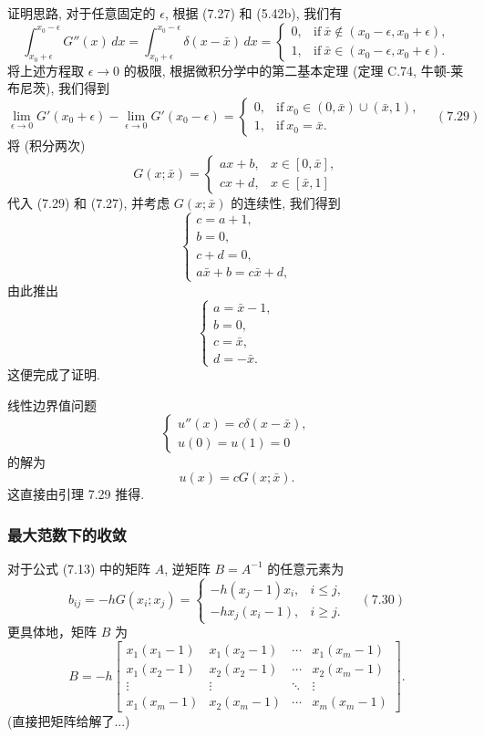 \documentclass[a4paper]{ctexart}
\newcommand{\hl}[1]
{\noindent {\bf {#1}}}
\begin{document}
{证明思路, 对于任意固定的 $\epsilon$, 根据 (7.27) 和 (5.42b), 我们有
$$
\int_{x_0 + \epsilon}^{x_0 - \epsilon} G''(x) \, dx 
= \int_{x_0 + \epsilon}^{x_0 - \epsilon} \delta(x - \bar{x}) \, dx = 
\begin{cases}
0, & \text{if} \ \bar{x} \notin (x_0 - \epsilon, x_0 + \epsilon), \\
1, & \text{if} \ \bar{x} \in (x_0 - \epsilon, x_0 + \epsilon).
\end{cases}
$$
将上述方程取 $\epsilon \to 0$ 的极限, 根据微积分学中的第二基本定理 
(定理 C.74, 牛顿-莱布尼茨), 我们得到
$$
\lim_{\epsilon \to 0} G'(x_0 + \epsilon) - \lim_{\epsilon \to 0} 
G'(x_0 - \epsilon) = \begin{cases}
0, & \text{if} \ x_0 \in (0, \bar{x}) \cup (\bar{x}, 1), \\
1, & \text{if} \ x_0 = \bar{x}.
\end{cases} \quad (7.29)
$$
将 (积分两次)
$$
G(x; \bar{x}) = \begin{cases} 
  ax + b, & x \in [0, \bar{x}], \\
  cx + d, & x \in [\bar{x}, 1] \end{cases}
$$ 
代入 (7.29) 和 (7.27), 并考虑 $G(x; \bar{x})$ 的连续性, 我们得到
$$
\begin{cases}
c = a + 1, \\
b = 0, \\
c + d = 0, \\
a\bar{x} + b = c\bar{x} + d,
\end{cases}
$$
由此推出
$$
\begin{cases}
a = \bar{x} - 1, \\
b = 0, \\
c = \bar{x}, \\
d = -\bar{x}.
\end{cases}
$$
这便完成了证明. 

\hl{推论 7.30} 线性边界值问题
$$
\begin{cases}
u''(x) = c\delta(x - \bar{x}), \\
u(0) = u(1) = 0
\end{cases}
$$
的解为
$$
u(x) = cG(x; \bar{x}).
$$
这直接由引理 7.29 推得.

\subsubsection{最大范数下的收敛}

\hl{引理 7.31} 对于公式 (7.13) 中的矩阵 $A$, 逆矩阵 $B = A^{-1}$ 的任意元素为
$$
b_{ij} = -hG(x_i; x_j) = \begin{cases}
-h(x_j - 1)x_i, & i \leq j, \\
-hx_j(x_i - 1), & i \geq j.
\end{cases} \quad (7.30)
$$
更具体地，矩阵 $B$ 为
$$
B = -h \begin{bmatrix}
x_1(x_1 - 1) & x_1(x_2 - 1) & \cdots & x_1(x_m - 1) \\
x_1(x_2 - 1) & x_2(x_2 - 1) & \cdots & x_2(x_m - 1) \\
\vdots & \vdots & \ddots & \vdots \\
x_1(x_m - 1) & x_2(x_m - 1) & \cdots & x_m(x_m - 1)
\end{bmatrix}.
$$
(直接把矩阵给解了...)

}
\end{document}
